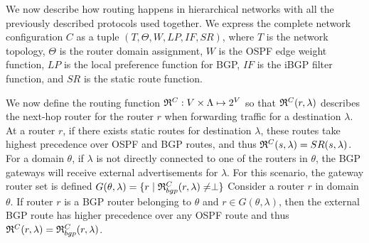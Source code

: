  We now describe how routing
happens in hierarchical networks with all the previously described protocols
used together.
We express the complete network configuration $C$
as a tuple $(T, \Theta,W,LP,IF,SR)$, where $T$ is the 
network topology, $\Theta$ is
the router domain assignment, $W$ is the OSPF
edge weight function,
$LP$  is the local preference function for BGP,
$IF$  is 
 the iBGP filter function, and 
 $SR$ is the static route
function.  

We now define the routing function 
$\mathfrak{R}^C: V \times \Lambda \mapsto 2^V$ 
so that
$\mathfrak{R}^C(r,\lambda)$
 describes the next-hop router for
 the 
router $r$ when forwarding traffic for a destination $\lambda$. 
At a router $r$, if there exists 
static routes for destination $\lambda$,
these routes take highest precedence over OSPF and BGP routes, 
and thus $\mathfrak{R}^C(s, \lambda) = SR(s, \lambda)$.
For a domain $\theta$, if $\lambda$ is not directly 
connected to one of the routers in $\theta$, the BGP 
gateways will receive external advertisements for $\lambda$.
For this scenario, the gateway router set is defined 
$G(\theta, \lambda) = \{r \mid \mathfrak{R}^C_{bgp}(r, \lambda) \not= \perp\}$
Consider a router $r$ in domain $\theta$. 
If router $r$ is a BGP router belonging to $\theta$ and $r \in G (\theta, \lambda)$, then the external BGP route has higher
precedence over any OSPF route and thus $\mathfrak{R}^C(r, \lambda)=\mathfrak{R}^C_{bgp}(r, \lambda)$. 

